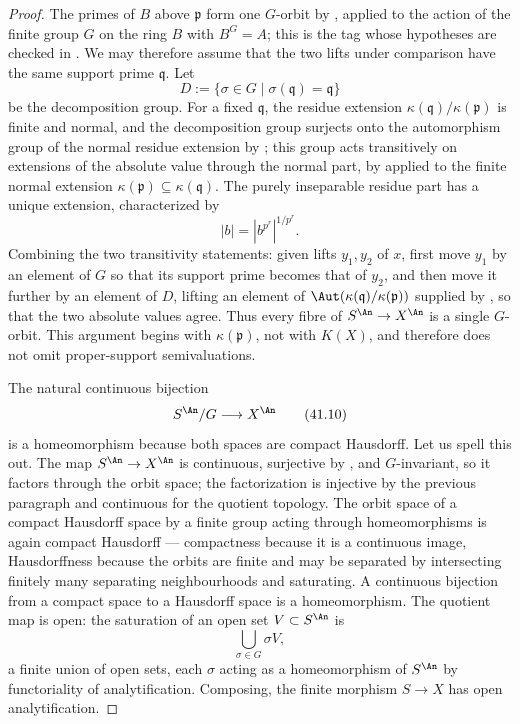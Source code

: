 \begin{proof}
The primes of $B$ above $\mathfrak p$ form one $G$-orbit by
\cite[\href{https://stacks.math.columbia.edu/tag/0BRI}{Tag 0BRI}]
{stacks-project}, applied to the action of the finite group $G$ on the
ring $B$ with $B^G=A$; this is the tag whose hypotheses are checked in
.  We may therefore assume that the two lifts
under comparison have the same support prime $\mathfrak q$.  Let
\[
 D:=\{\sigma\in G\mid\sigma(\mathfrak q)=\mathfrak q\}
\]
be the decomposition group.  For a fixed $\mathfrak q$, the residue
extension $\kappa(\mathfrak q)/\kappa(\mathfrak p)$ is finite and normal,
and the decomposition group
surjects onto the automorphism group of the normal residue extension by
\cite[\href{https://stacks.math.columbia.edu/tag/0BRJ}{Tag 0BRJ}]
{stacks-project}; this group acts transitively on extensions of the absolute
value through the normal part, by  applied
to the finite normal extension
$\kappa(\mathfrak p)\subseteq\kappa(\mathfrak q)$. The purely inseparable
residue part has a unique extension,
characterized by
\[
                              |b|=|b^{p^r}|^{1/p^r}.
\tag{41.9}\label{eq:bj-purely-inseparable-value}
\]
Combining the two transitivity statements: given lifts $y_1,y_2$ of $x$,
first move $y_1$ by an element of $G$ so that its support prime becomes
that of $y_2$, and then move it further by an element of $D$, lifting an
element of $\Aut(\kappa(\mathfrak q)/\kappa(\mathfrak p))$ supplied by
, so that the two absolute values agree.
Thus every fibre of $S^{\An}\to X^{\An}$ is a single $G$-orbit.
This argument begins with $\kappa(\mathfrak p)$, not with $K(X)$, and
therefore does not omit proper-support semivaluations.

The natural continuous bijection
\[
                             S^{\An}/G\longrightarrow X^{\An}
\tag{41.10}\label{eq:bj-galois-analytic-quotient}
\]
is a homeomorphism because both spaces are compact Hausdorff.  Let us spell
this out.  The map $S^{\An}\to X^{\An}$ is continuous, surjective by
, and $G$-invariant, so it factors
through the orbit space; the factorization is injective by the previous
paragraph and continuous for the quotient topology.  The orbit space of a
compact Hausdorff space by a finite group acting through homeomorphisms is
again compact Hausdorff --- compactness because it is a continuous image,
Hausdorffness because the orbits are finite and may be separated by
intersecting finitely many separating neighbourhoods and saturating.  A
continuous bijection from a compact space to a Hausdorff space is a
homeomorphism.  The quotient
map is open: the saturation of an open set $V\subset S^{\An}$ is
\[
                              \bigcup_{\sigma\in G}\sigma V,
\]
a finite union of open sets, each $\sigma$ acting as a homeomorphism of
$S^{\An}$ by functoriality of analytification.  Composing, the finite
morphism $S\to X$ has open analytification.


\end{proof}
